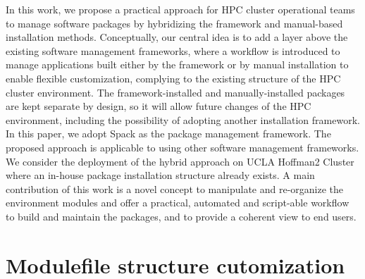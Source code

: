 \documentclass[conference]{IEEEtran}
\begin{document}
In this work, we propose a practical approach for HPC cluster operational teams to manage software packages by hybridizing the framework and manual-based installation methods. 
Conceptually, our central idea is to add a layer above the existing software management frameworks, where a workflow is introduced to manage applications built either by the framework or by manual installation to enable flexible customization, complying to the existing structure of the HPC cluster environment.
The framework-installed and manually-installed packages are kept separate by design, so it will allow future changes of the HPC environment, including the possibility of adopting another installation framework.
In this paper, we adopt Spack as the package management framework. The proposed approach is applicable to using other software management frameworks. We consider the deployment of the hybrid approach on UCLA Hoffman2 Cluster where an in-house package installation structure already exists.
A main contribution of this work is a novel concept to manipulate and re-organize the environment modules and offer a practical, automated and script-able workflow to build and maintain the packages, and to provide a coherent view to end users.



\section{Modulefile structure cutomization} \label{subsec_redefine_h2_modulefiles}

\end{document}
